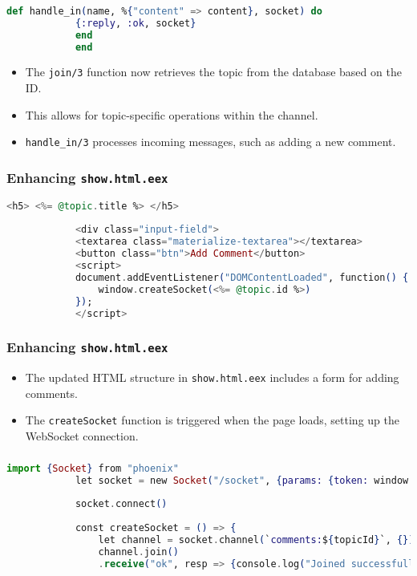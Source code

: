 \documentclass[aspectratio=169, table]{beamer}
\begin{document}
	\begin{frame}[fragile]
		\frametitle{}
		\begin{lstlisting}[language=Elixir]
			def handle_in(name, %{"content" => content}, socket) do
			{:reply, :ok, socket}
			end
			end
		\end{lstlisting}
		\begin{itemize}
			\item The \texttt{join/3} function now retrieves the topic from the database based on the ID.
			\item This allows for topic-specific operations within the channel.
			\item \texttt{handle\_in/3} processes incoming messages, such as adding a new comment.
		\end{itemize}
	\end{frame}
	
	\begin{frame}[fragile]
		\frametitle{Enhancing \texttt{show.html.eex}}
		\begin{lstlisting}[language=Elixir]
			<h5> <%= @topic.title %> </h5>
			
			<div class="input-field">
			<textarea class="materialize-textarea"></textarea>
			<button class="btn">Add Comment</button>
			<script>
			document.addEventListener("DOMContentLoaded", function() {
				window.createSocket(<%= @topic.id %>)
			}); 
			</script>
		\end{lstlisting}
	\end{frame}
	
	\begin{frame}[fragile]
		\frametitle{Enhancing \texttt{show.html.eex}}
		\begin{itemize}
			\item The updated HTML structure in \texttt{show.html.eex} includes a form for adding comments.
			\item The \texttt{createSocket} function is triggered when the page loads, setting up the WebSocket connection.
		\end{itemize}
	\end{frame}
	
	\begin{frame}[fragile]
		\frametitle{}
		\begin{lstlisting}[language=Elixir]
			import {Socket} from "phoenix"
			let socket = new Socket("/socket", {params: {token: window.userToken}})
			
			socket.connect()
			
			const createSocket = () => {
				let channel = socket.channel(`comments:${topicId}`, {})
				channel.join()
				.receive("ok", resp => {console.log("Joined successfully", resp);})
		\end{lstlisting}
	\end{frame}
	
\end{document}
